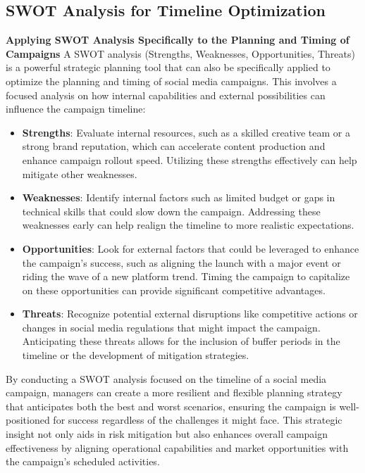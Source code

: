 \documentclass[
]{book}
\begin{document}
\hypertarget{swot-analysis-for-timeline-optimization}{%
\subsection*{SWOT Analysis for Timeline Optimization}\label{swot-analysis-for-timeline-optimization}}

\textbf{Applying SWOT Analysis Specifically to the Planning and Timing of Campaigns}
A SWOT analysis (Strengths, Weaknesses, Opportunities, Threats) is a powerful strategic planning tool that can also be specifically applied to optimize the planning and timing of social media campaigns. This involves a focused analysis on how internal capabilities and external possibilities can influence the campaign timeline:

\begin{itemize}
\item
  \textbf{Strengths}: Evaluate internal resources, such as a skilled creative team or a strong brand reputation, which can accelerate content production and enhance campaign rollout speed. Utilizing these strengths effectively can help mitigate other weaknesses.
\item
  \textbf{Weaknesses}: Identify internal factors such as limited budget or gaps in technical skills that could slow down the campaign. Addressing these weaknesses early can help realign the timeline to more realistic expectations.
\item
  \textbf{Opportunities}: Look for external factors that could be leveraged to enhance the campaign's success, such as aligning the launch with a major event or riding the wave of a new platform trend. Timing the campaign to capitalize on these opportunities can provide significant competitive advantages.
\item
  \textbf{Threats}: Recognize potential external disruptions like competitive actions or changes in social media regulations that might impact the campaign. Anticipating these threats allows for the inclusion of buffer periods in the timeline or the development of mitigation strategies.
\end{itemize}

By conducting a SWOT analysis focused on the timeline of a social media campaign, managers can create a more resilient and flexible planning strategy that anticipates both the best and worst scenarios, ensuring the campaign is well-positioned for success regardless of the challenges it might face. This strategic insight not only aids in risk mitigation but also enhances overall campaign effectiveness by aligning operational capabilities and market opportunities with the campaign's scheduled activities.
\end{document}
